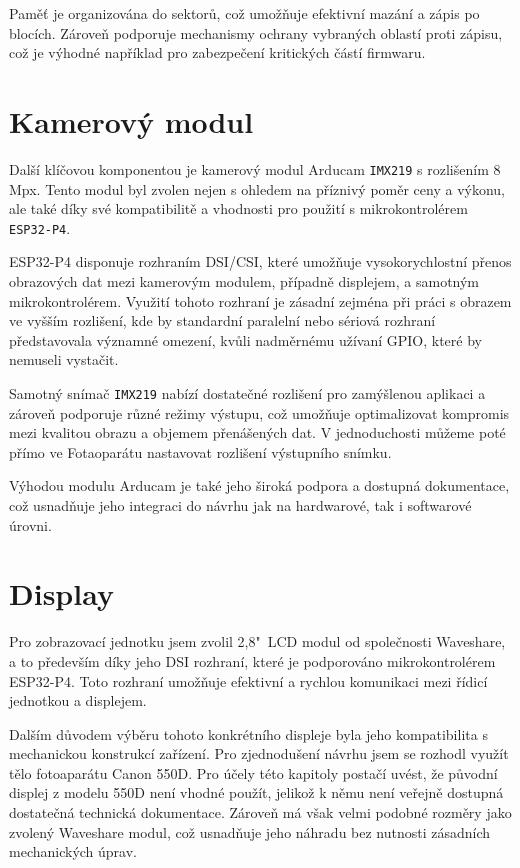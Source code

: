 \documentclass[12pt, a4paper, oneside]{report}
\begin{document}
Paměť je organizována do sektorů, což umožňuje efektivní mazání a zápis po blocích. Zároveň podporuje mechanismy ochrany vybraných oblastí proti zápisu, což je výhodné například pro zabezpečení kritických částí firmwaru.
\section{Kamerový modul}
Další klíčovou komponentou je kamerový modul Arducam \texttt{IMX219} s rozlišením 8 Mpx. Tento modul byl zvolen nejen s ohledem na příznivý poměr ceny a výkonu, ale také díky své kompatibilitě a vhodnosti pro použití s mikrokontrolérem \texttt{ESP32-P4}.

ESP32-P4 disponuje rozhraním DSI/CSI, které umožňuje vysokorychlostní přenos obrazových dat mezi kamerovým modulem, případně displejem, a samotným mikrokontrolérem. Využití tohoto rozhraní je zásadní zejména při práci s obrazem ve vyšším rozlišení, kde by standardní paralelní nebo sériová rozhraní představovala významné omezení, kvůli nadměrnému užívaní GPIO, které by nemuseli vystačit.

Samotný snímač \texttt{IMX219} nabízí dostatečné rozlišení pro zamýšlenou aplikaci a zároveň podporuje různé režimy výstupu, což umožňuje optimalizovat kompromis mezi kvalitou obrazu a objemem přenášených dat. V jednoduchosti můžeme poté přímo ve Fotaoparátu nastavovat rozlišení výstupního snímku.

Výhodou modulu Arducam je také jeho široká podpora a dostupná dokumentace, což usnadňuje jeho integraci do návrhu jak na hardwarové, tak i softwarové úrovni.

\section{Display}
Pro zobrazovací jednotku jsem zvolil 2,8"~LCD modul od společnosti Waveshare, a to především díky jeho DSI rozhraní, které je podporováno mikrokontrolérem ESP32-P4. Toto rozhraní umožňuje efektivní a rychlou komunikaci mezi řídicí jednotkou a displejem.

Dalším důvodem výběru tohoto konkrétního displeje byla jeho kompatibilita s mechanickou konstrukcí zařízení. Pro zjednodušení návrhu jsem se rozhodl využít tělo fotoaparátu Canon 550D. Pro účely této kapitoly postačí uvést, že původní displej z modelu 550D není vhodné použít, jelikož k němu není veřejně dostupná dostatečná technická dokumentace. Zároveň má však velmi podobné rozměry jako zvolený Waveshare modul, což usnadňuje jeho náhradu bez nutnosti zásadních mechanických úprav.
\end{document}
